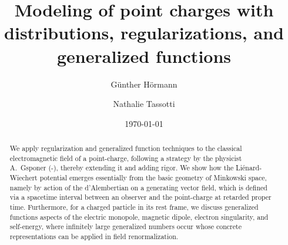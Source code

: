 \documentclass[sumlimits,intlimits,namelimits%
]{amsart}
\theoremstyle{definition}
\begin{document}
\pagestyle{plain}

\title{Modeling of point charges with distributions, regularizations, and generalized functions}


\author{G\"unther H\"ormann}

\author{Nathalie Tassotti}


\address{Fakult\"at f\"ur Mathematik\\
Universit\"at Wien, Austria}






\date{\today}

\begin{abstract} We apply regularization and generalized function techniques to the classical electromagnetic field of a point-charge, following a strategy by the physicist A.\ Gsponer (\cite{GEJPCorr}-\cite{GsponerCTED}), thereby extending it and adding rigor. We show how the Li\'{e}nard-Wiechert potential emerges essentially from the basic geometry of Minkowski space, namely by action of the d'Alembertian on a generating vector field, which is defined via a spacetime interval between an observer and the point-charge at retarded proper time.  
Furthermore, for a charged particle in its rest frame, we discuss generalized functions aspects of the electric monopole, magnetic dipole, electron singularity, and self-energy, where infinitely large generalized numbers occur whose concrete representations can be applied in field renormalization. 

\end{abstract}



\maketitle



%
%
%
\end{document}
